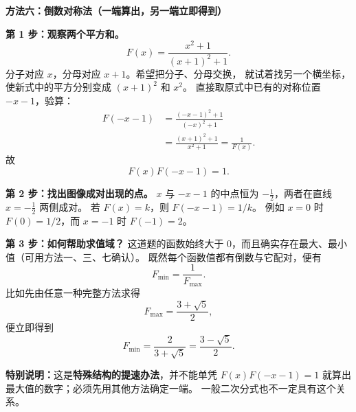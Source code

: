 \clearpage
\begin{proofbox}
\textbf{\textcolor{CProof}{方法六：倒数对称法（一端算出，另一端立即得到）}}

\textbf{第 1 步：观察两个平方和。}
\[
 F(x)=\frac{x^2+1}{(x+1)^2+1}.
\]
分子对应 $x$，分母对应 $x+1$。希望把分子、分母交换，
就试着找另一个横坐标，使新式中的平方分别变成 $(x+1)^2$ 和 $x^2$。
直接取原式中已有的对称位置 $-x-1$，验算：
\[
 \begin{aligned}
 F(-x-1)
 &=\frac{(-x-1)^2+1}{(-x)^2+1}\\
 &=\frac{(x+1)^2+1}{x^2+1}
 =\frac1{F(x)}.
 \end{aligned}
\]
故
\[
 \boxed{F(x)F(-x-1)=1.}
\]

\textbf{第 2 步：找出图像成对出现的点。}
$x$ 与 $-x-1$ 的中点恒为 $-\frac12$，两者在直线 $x=-\frac12$ 两侧成对。
若 $F(x)=k$，则 $F(-x-1)=1/k$。
例如 $x=0$ 时 $F(0)=1/2$，而 $x=-1$ 时 $F(-1)=2$。

\textbf{第 3 步：如何帮助求值域？}
这道题的函数始终大于 $0$，而且确实存在最大、最小值（可用方法一、三、七确认）。
既然每个函数值都有倒数与它配对，便有
\[
 \boxed{F_{\min}=\frac1{F_{\max}}.}
\]
比如先由任意一种完整方法求得
\[
  F_{\max}=\frac{3+\sqrt5}{2},
\]
便立即得到
\[
  F_{\min}=\frac{2}{3+\sqrt5}=\frac{3-\sqrt5}{2}.
\]

\textbf{特别说明：}这是\textbf{特殊结构的提速办法}，并不能单凭
$F(x)F(-x-1)=1$ 就算出最大值的数字；必须先用其他方法确定一端。
一般二次分式也不一定具有这个关系。
\end{proofbox}


